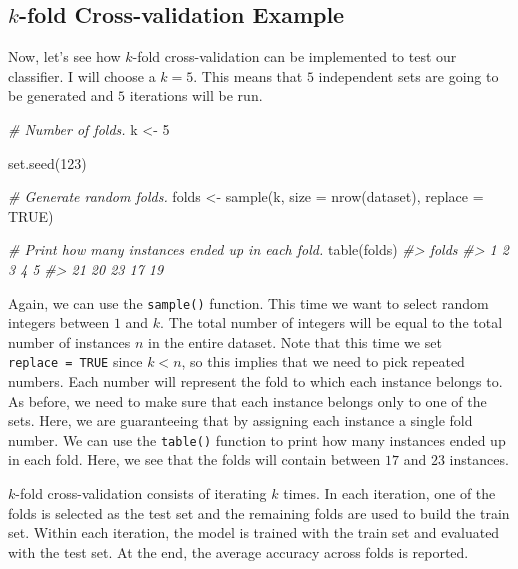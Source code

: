 \documentclass[
  11pt,
]{krantz}
\newenvironment{Shaded}{\begin{snugshade}}{\end{snugshade}}
\newcommand{\AttributeTok}[1]{\textcolor[rgb]{0.61,0.61,0.61}{#1}}
\newcommand{\CommentTok}[1]{\textcolor[rgb]{0.37,0.37,0.37}{\textit{#1}}}
\newcommand{\ConstantTok}[1]{\textcolor[rgb]{0,0,0}{#1}}
\newcommand{\DecValTok}[1]{\textcolor[rgb]{0.06,0.06,0.06}{#1}}
\newcommand{\FunctionTok}[1]{\textcolor[rgb]{0,0,0}{#1}}
\newcommand{\NormalTok}[1]{#1}
\newcommand{\OtherTok}[1]{\textcolor[rgb]{0.37,0.37,0.37}{#1}}
\begin{document}
\hypertarget{k-fold-cross-validation-example}{%
\subsection{\texorpdfstring{\(k\)-fold Cross-validation Example}{k-fold Cross-validation Example}}\label{k-fold-cross-validation-example}}

Now, let's see how \(k\)-fold cross-validation can be implemented to test our classifier. I will choose a \(k=5\). This means that \(5\) independent sets are going to be generated and \(5\) iterations will be run.

\begin{Shaded}
\begin{Highlighting}[]
\CommentTok{\# Number of folds.}
\NormalTok{k }\OtherTok{\textless{}{-}} \DecValTok{5}

\FunctionTok{set.seed}\NormalTok{(}\DecValTok{123}\NormalTok{)}

\CommentTok{\# Generate random folds.}
\NormalTok{folds }\OtherTok{\textless{}{-}} \FunctionTok{sample}\NormalTok{(k, }\AttributeTok{size =} \FunctionTok{nrow}\NormalTok{(dataset), }\AttributeTok{replace =} \ConstantTok{TRUE}\NormalTok{)}

\CommentTok{\# Print how many instances ended up in each fold.}
\FunctionTok{table}\NormalTok{(folds)}
\CommentTok{\#\textgreater{} folds}
\CommentTok{\#\textgreater{}  1  2  3  4  5 }
\CommentTok{\#\textgreater{} 21 20 23 17 19 }
\end{Highlighting}
\end{Shaded}

Again, we can use the \texttt{sample()} function. This time we want to select random integers between \(1\) and \(k\). The total number of integers will be equal to the total number of instances \(n\) in the entire dataset. Note that this time we set \texttt{replace\ =\ TRUE} since \(k < n\), so this implies that we need to pick repeated numbers. Each number will represent the fold to which each instance belongs to. As before, we need to make sure that each instance belongs only to one of the sets. Here, we are guaranteeing that by assigning each instance a single fold number. We can use the \texttt{table()} function to print how many instances ended up in each fold. Here, we see that the folds will contain between \(17\) and \(23\) instances.

\(k\)-fold cross-validation consists of iterating \(k\) times. In each iteration, one of the folds is selected as the test set and the remaining folds are used to build the train set. Within each iteration, the model is trained with the train set and evaluated with the test set. At the end, the average accuracy across folds is reported.
\end{document}
